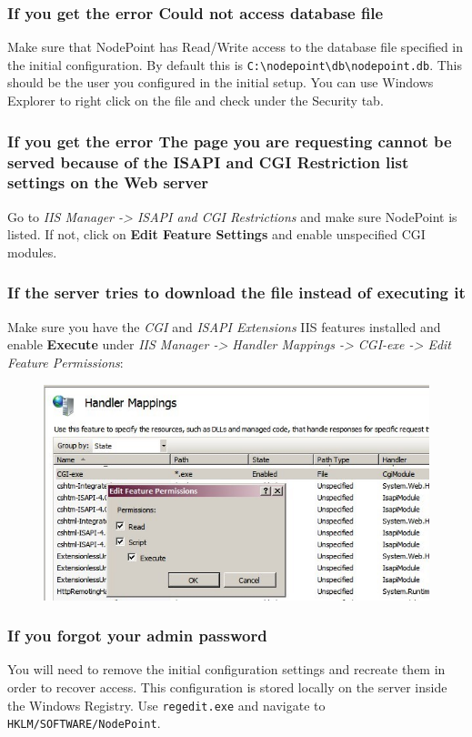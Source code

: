 \documentclass[11pt]{article}
\begin{document}
{\subsubsection{If you get the error Could not access database file}

Make sure that NodePoint has Read/Write access to the database file specified in the initial configuration. By default this is \texttt{C:\textbackslash nodepoint\textbackslash db\textbackslash nodepoint.db}. This should be the user you configured in the initial setup. You can use Windows Explorer to right click on the file and check under the Security tab.

\subsubsection{If you get the error The page you are requesting cannot be served because of the ISAPI and CGI Restriction list settings on the Web server}

Go to \textit{IIS Manager -> ISAPI and CGI Restrictions} and make sure NodePoint is listed. If not, click on \textbf{Edit Feature Settings} and enable unspecified CGI modules.

\subsubsection{If the server tries to download the file instead of executing it}

Make sure you have the \textit{CGI} and \textit{ISAPI Extensions} IIS features installed and enable \textbf{Execute} under \textit{IIS Manager -> Handler Mappings -> CGI-exe -> Edit Feature Permissions}:

\begin{figure}[h]
\includegraphics{handlermapping.jpg}
\end{figure}

\subsubsection{If you forgot your admin password}

You will need to remove the initial configuration settings and recreate them in order to recover access. This configuration is stored locally on the server inside the Windows Registry. Use \texttt{regedit.exe} and navigate to \texttt{HKLM/SOFTWARE/NodePoint}.
}
\end{document}
